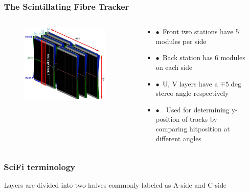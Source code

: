 \documentclass[xcolor=dvipsnames, aspectratio=1610, 12pt]{beamer}
\begin{document}
\begin{frame}\frametitle{The Scintillating Fibre Tracker}
  \begin{columns}
    \begin{column}[c]{0.48\textwidth}
      \begin{figure}
        \includegraphics[width=0.9\textwidth]{logos/scifi.png}
      \end{figure}
    \end{column}
    \begin{column}{0.48\textwidth}
      \begin{itemize}
        \item $\bullet$\, Front two stations have 5 modules per side
        \item $\bullet$\, Back station has 6 modules on each side
        \item $\bullet$\, U, V layers have a $\mp 5 \deg$ stereo angle respectively
        \item $\bullet$\, \to\, Used for determining y-position of tracks by comparing hitposition at different angles
      \end{itemize}
    \end{column}
  \end{columns}
\end{frame}

\begin{frame}\frametitle{SciFi terminology}
  Layers are divided into two halves commonly labeled as A-side and C-side
  
\end{frame}
\end{document}
